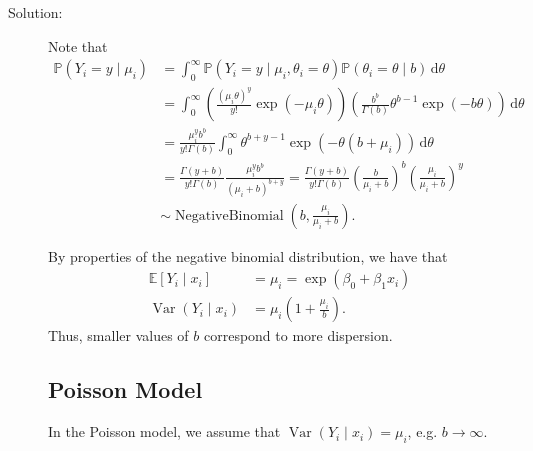 \documentclass[letterpaper,11pt]{article}
\begin{document}
\begin{enumerate}
  \begin{description}
  \item[Solution:] Note that
    \begin{align}
      \mathbb{P}\left(
      Y_i = y \mid \mu_i
      \right)
      &= \int_0^\infty\mathbb{P}\left(
      Y_i = y \mid \mu_i, \theta_i = \theta
      \right)\mathbb{P}\left(
      \theta_i = \theta
      \mid b
        \right)
        \,\mathrm{d}\theta \nonumber\\
      &= \int_0^\infty
        \left(
        \frac{\left(\mu_i\theta\right)^y}{y!}\exp\left(-\mu_i\theta\right)
        \right)
        \left(
        \frac{b^b}{\Gamma(b)}\theta^{b-1}
        \exp\left(-b\theta\right)
        \right)        
        \,\mathrm{d}\theta \nonumber\\
      &= \frac{\mu_i^y b^b}{y!\Gamma(b)}
        \int_0^\infty
        \theta^{b + y - 1}\exp\left(-\theta(b + \mu_i)\right)
        \,\mathrm{d}\theta \nonumber\\
      &= \frac{\Gamma(y + b)}{y!\Gamma(b)}
        \frac{\mu_i^y b^b}{\left(\mu_i + b\right)^{b + y}}
        = \frac{\Gamma(y + b)}{y!\Gamma(b)}
        \left(\frac{b}{\mu_i + b}\right)^b
        \left(\frac{\mu_i}{\mu_i + b}\right)^y
        \nonumber\\
      &\sim \operatorname{NegativeBinomial}\left(
        b,
        \frac{\mu_i}{\mu_i + b}
        \right).
        \label{eqn:p1_negative_binomial}
    \end{align}

    By properties of the negative binomial distribution, we have that
    \begin{align}
      \mathbb{E}\left[
      Y_i
      \mid x_i
      \right]
      &= \mu_i = \exp\left(\beta_0 + \beta_1x_i\right) \nonumber\\
      \operatorname{Var}\left(Y_i \mid x_i\right)
      &= \mu_i\left(
        1 + \frac{\mu_i}{b}
        \right).
      \label{eqn:p1_y_mean_variance}
    \end{align}
    Thus, smaller values of $b$ correspond to more dispersion.

    \subsection*{Poisson Model}

    In the Poisson model, we assume that $\operatorname{Var}\left(Y_i \mid
      x_i\right) = \mu_i$, e.g. $b \rightarrow \infty$.


\end{description}
\end{enumerate}
\end{document}
